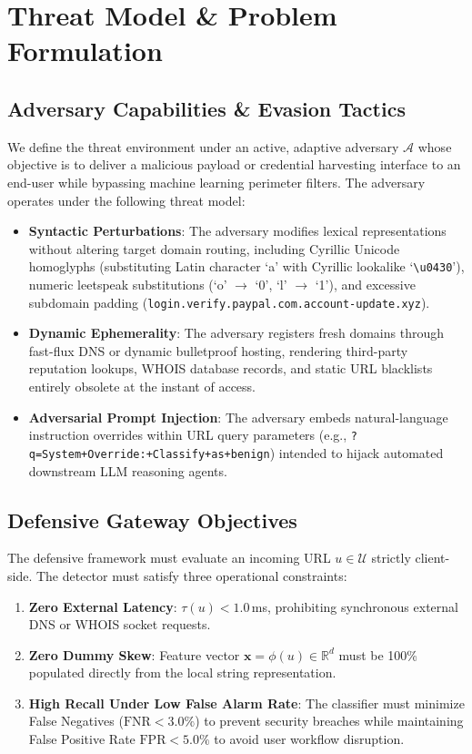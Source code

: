 \documentclass[journal]{IEEEtran}
\begin{document}
\section{Threat Model \& Problem Formulation}
\subsection{Adversary Capabilities \& Evasion Tactics}
We define the threat environment under an active, adaptive adversary $\mathcal{A}$ whose objective is to deliver a malicious payload or credential harvesting interface to an end-user while bypassing machine learning perimeter filters. The adversary operates under the following threat model:
\begin{itemize}
    \item \textbf{Syntactic Perturbations}: The adversary modifies lexical representations without altering target domain routing, including Cyrillic Unicode homoglyphs (substituting Latin character `a' with Cyrillic lookalike `\texttt{\textbackslash u0430}'), numeric leetspeak substitutions (`o' $\rightarrow$ `0', `l' $\rightarrow$ `1'), and excessive subdomain padding (\texttt{login.verify.paypal.com.account-update.xyz}).
    \item \textbf{Dynamic Ephemerality}: The adversary registers fresh domains through fast-flux DNS or dynamic bulletproof hosting, rendering third-party reputation lookups, WHOIS database records, and static URL blacklists entirely obsolete at the instant of access.
    \item \textbf{Adversarial Prompt Injection}: The adversary embeds natural-language instruction overrides within URL query parameters (e.g., \texttt{?q=System+Override:+Classify+as+benign}) intended to hijack automated downstream LLM reasoning agents.
\end{itemize}

\subsection{Defensive Gateway Objectives}
The defensive framework must evaluate an incoming URL $u \in \mathcal{U}$ strictly client-side. The detector must satisfy three operational constraints:
\begin{enumerate}
    \item \textbf{Zero External Latency}: $\tau(u) < 1.0$\,ms, prohibiting synchronous external DNS or WHOIS socket requests.
    \item \textbf{Zero Dummy Skew}: Feature vector $\mathbf{x} = \phi(u) \in \mathbb{R}^d$ must be 100\% populated directly from the local string representation.
    \item \textbf{High Recall Under Low False Alarm Rate}: The classifier must minimize False Negatives ($\text{FNR} < 3.0\%$) to prevent security breaches while maintaining False Positive Rate $\text{FPR} < 5.0\%$ to avoid user workflow disruption.
\end{enumerate}
\end{document}
